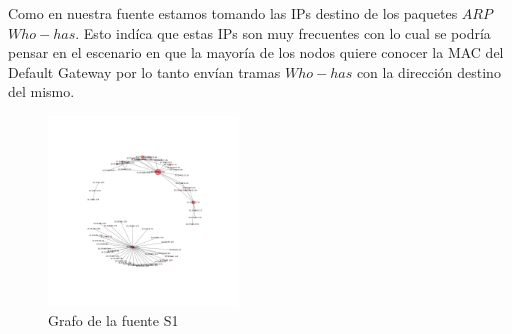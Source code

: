 Como en nuestra fuente estamos tomando las IPs destino de los paquetes $ARP$ $Who-has$. Esto indíca que estas IPs son muy frecuentes con lo cual se podría pensar en el escenario en que la mayoría de los nodos quiere conocer la MAC del Default Gateway por lo tanto envían tramas $Who-has$ con la dirección destino del mismo.


\begin{figure}[h]
  \centering
    \includegraphics[width=0.45\textwidth]{grafo_red_despegar.png}
  \caption{Grafo de la fuente S1}
  \label{grafo-s1}
\end{figure}